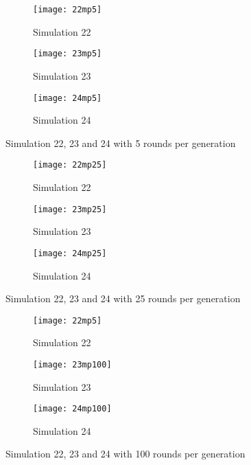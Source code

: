 \begin{figure}[H]       
    \centering
    \begin{subfigure}[b]{0.3\textwidth}
	\centering
	{\texttt{[image: 22mp5]}}   
    	\caption{Simulation 22}
	\label{fig:mpsim225}
    \end{subfigure}
    \hfill
    \begin{subfigure}[b]{0.3\textwidth}
	\centering
	{\texttt{[image: 23mp5]}}   
    	\caption{Simulation 23}
	\label{fig:mpsim235}
    \end{subfigure}
    \hfill
    \begin{subfigure}[b]{0.3\textwidth}
	\centering
	{\texttt{[image: 24mp5]}}   
    	\caption{Simulation 24}
	\label{fig:mpsim245}
    \end{subfigure}
    \caption{Simulation 22, 23 and 24 with 5 rounds per generation}
    \label{mpsim222324simulations5}
\end{figure}

\begin{figure}[H]       
    \centering
    \begin{subfigure}[b]{0.3\textwidth}
	\centering
	{\texttt{[image: 22mp25]}}   
    	\caption{Simulation 22}
	\label{fig:mpsim2225}
    \end{subfigure}
    \hfill
    \begin{subfigure}[b]{0.3\textwidth}
	\centering
	{\texttt{[image: 23mp25]}}   
    	\caption{Simulation 23}
	\label{fig:mpsim2325}
    \end{subfigure}
    \hfill
    \begin{subfigure}[b]{0.3\textwidth}
	\centering
	{\texttt{[image: 24mp25]}}   
    	\caption{Simulation 24}
	\label{fig:mpsim2425}
    \end{subfigure}
    \caption{Simulation 22, 23 and 24 with 25 rounds per generation}
    \label{mpsim222324simulations25}
\end{figure}


\begin{figure}[H]       
    \centering
    \begin{subfigure}[b]{0.3\textwidth}
	\centering
	{\texttt{[image: 22mp5]}}   
    	\caption{Simulation 22}
	\label{fig:mpsim225}
    \end{subfigure}
    \hfill
    \begin{subfigure}[b]{0.3\textwidth}
	\centering
	{\texttt{[image: 23mp100]}}   
    	\caption{Simulation 23}
	\label{fig:mpsim23100}
    \end{subfigure}
    \hfill
    \begin{subfigure}[b]{0.3\textwidth}
	\centering
	{\texttt{[image: 24mp100]}}   
    	\caption{Simulation 24}
	\label{fig:mpsim24100}
    \end{subfigure}
    \caption{Simulation 22, 23 and 24 with 100 rounds per generation}
    \label{mpsim222324simulations100}
\end{figure}

